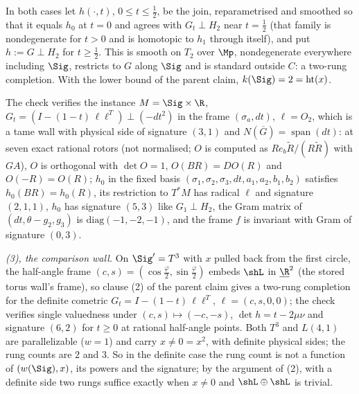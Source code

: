 In both cases let $h(\cdot, t)$, $0 \leq t \leq \frac12$, be the join, reparametrised and smoothed so that it equals $h_0$ at $t = 0$ and agrees with $G_t \perp H_2$ near $t = \frac12$ (that family is nondegenerate for $t > 0$ and is homotopic to $h_1$ through itself), and put $h := G \perp H_2$ for $t \geq \frac12$. This is smooth on $T_2$ over $\Mp$, nondegenerate everywhere including $\Sig$, restricts to $G$ along $\Sig$ and is standard outside $C$: a two-rung completion. With the lower bound of the parent claim, $k(\Sig) = 2 = \operatorname{ht}(x)$.

The check verifies the instance $M = \Sig \times \R$, $G_t = (I - (1-t)\,\ell\ell^{T}) \perp (-dt^{2})$ in the frame $(\sigma_a, dt)$, $\ell = O_2$, which is a tame wall with physical side of signature $(3,1)$ and $N(\overline G) = \operatorname{span}(dt)$: at seven exact rational rotors (not normalised; $O$ is computed as $R e_b \tilde R/(R\tilde R)$ with $GA$), $O$ is orthogonal with $\det O = 1$, $O(BR) = DO(R)$ and $O(-R) = O(R)$; $h_0$ in the fixed basis $(\sigma_1,\sigma_2,\sigma_3,dt,a_1,a_2,b_1,b_2)$ satisfies $h_0(BR) = h_0(R)$, its restriction to $T^*M$ has radical $\ell$ and signature $(2,1,1)$, $h_0$ has signature $(5,3)$ like $G_1 \perp H_2$, the Gram matrix of $(dt, \theta - g_2, g_3)$ is $\mathrm{diag}(-1,-2,-1)$, and the frame $f$ is invariant with Gram of signature $(0,3)$.

\emph{(3), the comparison wall.} On $\Sig' = T^{3}$ with $x$ pulled back from the first circle, the half-angle frame $(c, s) = (\cos\frac\varphi2, \sin\frac\varphi2)$ embeds $\shL$ in $\underline{\R}^{2}$ (the stored torus wall's frame), so clause (2) of the parent claim gives a two-rung completion for the definite cometric $G_t = I - (1-t)\,\ell\ell^{T}$, $\ell = (c, s, 0, 0)$; the check verifies single valuedness under $(c,s) \mapsto (-c,-s)$, $\det h = t - 2\mu\nu$ and signature $(6,2)$ for $t \geq 0$ at rational half-angle points. Both $T^{3}$ and $L(4,1)$ are parallelizable ($w = 1$) and carry $x \neq 0 = x^{2}$, with definite physical sides; the rung counts are $2$ and $3$. So in the definite case the rung count is not a function of $(w(\Sig), x)$, its powers and the signature; by the argument of (2), with a definite side two rungs suffice exactly when $x \neq 0$ and $\shL \oplus \shL$ is trivial.

